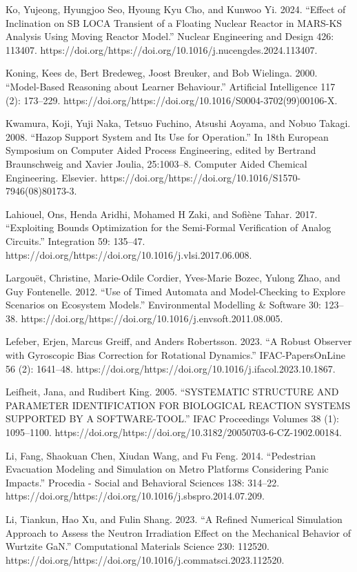 \documentclass[utf8]{gradu3}
\begin{document}
Ko, Yujeong, Hyungjoo Seo, Hyoung Kyu Cho, and Kunwoo Yi. 2024. “Effect of Inclination on SB LOCA Transient of a Floating Nuclear Reactor in MARS-KS Analysis Using Moving Reactor Model.” Nuclear Engineering and Design 426: 113407. https://doi.org/https://doi.org/10.1016/j.nucengdes.2024.113407.

Koning, Kees de, Bert Bredeweg, Joost Breuker, and Bob Wielinga. 2000. “Model-Based Reasoning about Learner Behaviour.” Artificial Intelligence 117 (2): 173–229. https://doi.org/https://doi.org/10.1016/S0004-3702(99)00106-X.

Kwamura, Koji, Yuji Naka, Tetsuo Fuchino, Atsushi Aoyama, and Nobuo Takagi. 2008. “Hazop Support System and Its Use for Operation.” In 18th European Symposium on Computer Aided Process Engineering, edited by Bertrand Braunschweig and Xavier Joulia, 25:1003–8. Computer Aided Chemical Engineering. Elsevier. https://doi.org/https://doi.org/10.1016/S1570-7946(08)80173-3.

Lahiouel, Ons, Henda Aridhi, Mohamed H Zaki, and Sofiène Tahar. 2017. “Exploiting Bounds Optimization for the Semi-Formal Verification of Analog Circuits.” Integration 59: 135–47. https://doi.org/https://doi.org/10.1016/j.vlsi.2017.06.008.

Largouët, Christine, Marie-Odile Cordier, Yves-Marie Bozec, Yulong Zhao, and Guy Fontenelle. 2012. “Use of Timed Automata and Model-Checking to Explore Scenarios on Ecosystem Models.” Environmental Modelling \& Software 30: 123–38. https://doi.org/https://doi.org/10.1016/j.envsoft.2011.08.005.

Lefeber, Erjen, Marcus Greiff, and Anders Robertsson. 2023. “A Robust Observer with Gyroscopic Bias Correction for Rotational Dynamics.” IFAC-PapersOnLine 56 (2): 1641–48. https://doi.org/https://doi.org/10.1016/j.ifacol.2023.10.1867.

Leifheit, Jana, and Rudibert King. 2005. “SYSTEMATIC STRUCTURE AND PARAMETER IDENTIFICATION FOR BIOLOGICAL REACTION SYSTEMS SUPPORTED BY A SOFTWARE-TOOL.” IFAC Proceedings Volumes 38 (1): 1095–1100. https://doi.org/https://doi.org/10.3182/20050703-6-CZ-1902.00184.

Li, Fang, Shaokuan Chen, Xiudan Wang, and Fu Feng. 2014. “Pedestrian Evacuation Modeling and Simulation on Metro Platforms Considering Panic Impacts.” Procedia - Social and Behavioral Sciences 138: 314–22. https://doi.org/https://doi.org/10.1016/j.sbspro.2014.07.209.

Li, Tiankun, Hao Xu, and Fulin Shang. 2023. “A Refined Numerical Simulation Approach to Assess the Neutron Irradiation Effect on the Mechanical Behavior of Wurtzite GaN.” Computational Materials Science 230: 112520. https://doi.org/https://doi.org/10.1016/j.commatsci.2023.112520.
\end{document}
